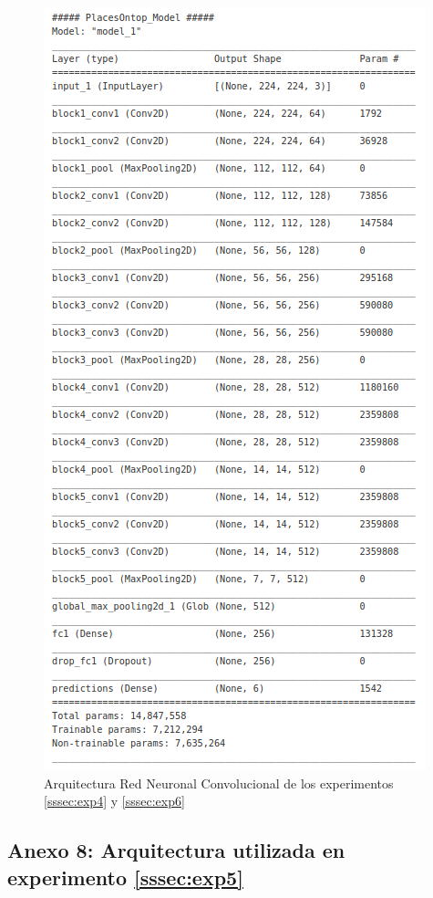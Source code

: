 \begin{figure}[!htb]
	\centering
	\includegraphics[width=0.7\linewidth]{images/architecture_exp4_6_cnn}
	\caption{Arquitectura Red Neuronal Convolucional de los experimentos \ref{sssec:exp4} y \ref{sssec:exp6} }
	\label{fig:architectureexp4_6}
\end{figure}

\subsection{Anexo 8: Arquitectura utilizada en experimento \ref{sssec:exp5}}\label{ssec:anexo8}

